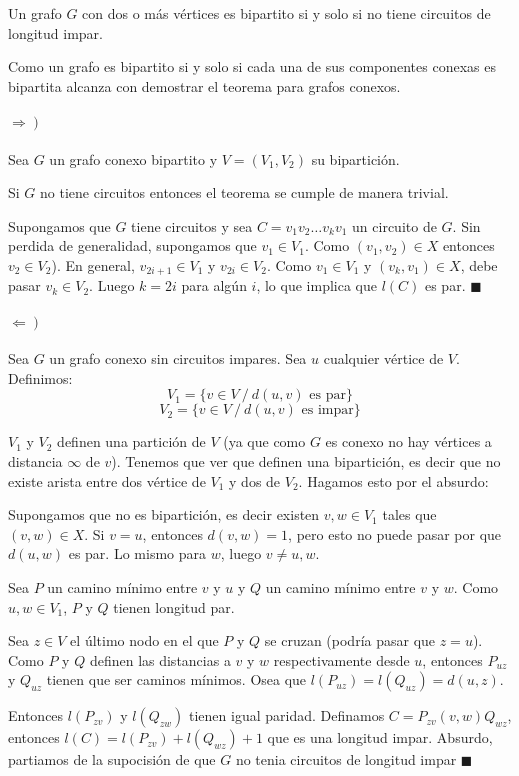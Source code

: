\begin{theorem}
	Un grafo \(G\) con dos o más vértices es bipartito si y solo si no tiene circuitos de longitud impar.
\end{theorem}
\begin{demo}
	Como un grafo es bipartito si y solo si cada una de sus componentes conexas es bipartita alcanza con demostrar el teorema para grafos conexos. 
	\paragraph{\(\left.\Rightarrow\right) \)} Sea \(G\) un grafo conexo bipartito y \(V = (V_1,V_2)\) su bipartición.
	
	Si \(G\) no tiene circuitos entonces el teorema se cumple de manera trivial.
	
	Supongamos que \(G\) tiene circuitos y sea \(C = v_1v_2\dots v_kv_1\) un circuito de \(G\). Sin perdida de generalidad, supongamos que \(v_1\in V_1\). Como \((v_1,v_2) \in X\) entonces \(v_2\in V_2\)). En general, \(v_{2i + 1}\in V_1\) y \(v_{2i}\in V_2\). Como \(v_1\in V_1\) y \((v_k,v_1)\in X\), debe pasar \(v_k\in V_2\). Luego \(k = 2i\) para algún \(i\), lo que implica que \(l(C)\) es par. \(\blacksquare\)
\end{demo}
\begin{demoPart}
	
	\paragraph{\(\left.\Leftarrow\right)\)} Sea \(G\) un grafo conexo sin circuitos impares. Sea \(u\) cualquier vértice de \(V\). Definimos: \[V_1 = \{ v\in V~/~d(u,v) \text{ es par}\}\] \[V_2 = \{ v\in V~/~d(u,v) \text{ es impar}\}\]

	\(V_1\) y \(V_2\) definen una partición de \(V\) (ya que como \(G\) es conexo no hay vértices a distancia \(\infty\) de \(v\)). Tenemos que ver que definen una bipartición, es decir que no existe arista entre dos vértice de \(V_1\) y dos de \(V_2\). Hagamos esto por el absurdo:
	
	Supongamos que no es bipartición, es decir existen \(v,w\in V_1\) tales que \((v,w)\in X\). Si \(v = u\), entonces \(d(v,w) = 1\), pero esto no puede pasar por que \(d(u,w) \) es par. Lo mismo para \(w\), luego \(v\neq u,w\).
	
	Sea \(P\) un camino mínimo entre \(v\) y \(u\) y \(Q\) un camino mínimo entre \(v\) y \(w\). Como \(u,w\in V_1\), \(P\) y \(Q\) tienen longitud par.
	
	Sea \(z\in V\) el último nodo en el que \(P\) y \(Q\) se cruzan (podría pasar que \(z = u\)). Como \(P\) y \(Q\) definen las distancias a \(v\) y \(w\) respectivamente desde \(u\), entonces \(P_{uz}\) y \(Q_{uz}\) tienen que ser caminos mínimos. Osea que \(l(P_{uz}) = l(Q_{uz}) = d(u,z)\).
	
	Entonces \(l(P_{zv})\) y \(l(Q_{zw})\) tienen igual paridad. Definamos \(C = P_{zv}(v,w)Q_{wz}\), entonces \(l(C) = l(P_{zv}) + l(Q_{wz}) + 1\) que es una longitud impar. Absurdo, partiamos de la supocisión de que \(G\) no tenia circuitos de longitud impar \(\blacksquare\)
\end{demoPart}

